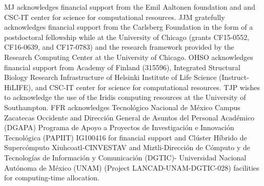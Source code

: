 \documentclass[journal=jpcbfk,manuscript=article]{achemso}
\begin{document}
\begin{acknowledgement}
  MJ acknowledges financial support from the Emil Aaltonen foundation and
  and CSC-IT center for science for computational resources.
  JJM gratefully acknowledges financial support from the Carlsberg Foundation in the form of a postdoctoral fellowship while at the University of Chicago (grants CF15-0552, CF16-0639, and CF17-0783) and the research framework provided by the Research Computing Center at the University of Chicago.
  OHSO acknowledges financial support from Academy of Finland (315596),
  Integrated Structural Biology Research Infrastructure of
  Helsinki Institute of Life Science (Instruct-HiLIFE), and
  CSC-IT center for science for computational resources.
  TJP wishes to acknowledge the use of the Iridis computing resources at the University of Southampton.
  FFR acknowledges Tecnol\'{o}gico Nacional de M\'{e}xico Campus Zacatecas Occidente and
  Direcci\'{o}n General de Asuntos del Personal Acad\'{e}mico (DGAPA)
  Programa de Apoyo a Proyectos de Investigaci\'{o}n e Innovaci\'{o}n
  Tecnol\'{o}gica (PAPIIT) IG100416 for financial support and Cl\'{u}ster
  H\'{i}brido de Superc\'{o}mputo Xiuhcoatl-CINVESTAV and Miztli-Direcci\'{o}n de
  C\'{o}mputo y de Tecnolog\'{i}as de Informaci\'{o}n y Comunicaci\'{o}n (DGTIC)-
  Universidad Nacional Aut\'{o}noma de M\'{e}xico (UNAM) (Project
  LANCAD-UNAM-DGTIC-028) facilities for computing-time allocation.
\end{acknowledgement}






\end{document}
